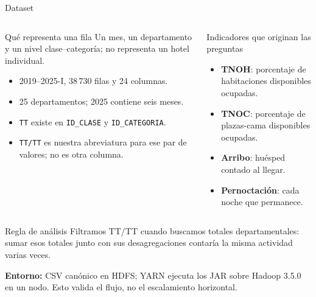 \documentclass{beamer}
\begin{document}
\begin{frame}{Dataset}
\footnotesize
\begin{columns}[T,onlytextwidth]
\begin{block}{Qué representa una fila}
Un mes, un departamento y un nivel clase--categoría; no representa un hotel individual.
\begin{itemize}
  \item 2019--2025-I, 38\,730 filas y 24 columnas.
  \item 25 departamentos; 2025 contiene seis meses.
  \item \texttt{TT} existe en \texttt{ID\_CLASE} y \texttt{ID\_CATEGORIA}.
  \item \texttt{TT/TT} es nuestra abreviatura para ese par de valores; no es otra columna.
\end{itemize}
\end{block}
\begin{block}{Indicadores que originan las preguntas}
\begin{itemize}
  \item \textbf{TNOH}: porcentaje de habitaciones disponibles ocupadas.
  \item \textbf{TNOC}: porcentaje de plazas-cama disponibles ocupadas.
  \item \textbf{Arribo}: huésped contado al llegar.
  \item \textbf{Pernoctación}: cada noche que permanece.
\end{itemize}
\end{block}
\end{columns}
\begin{alertblock}{Regla de análisis}
Filtramos TT/TT cuando buscamos totales departamentales: sumar esos totales junto con sus desagregaciones contaría la misma actividad varias veces.
\end{alertblock}
\textbf{Entorno:} CSV canónico en HDFS; YARN ejecuta los JAR sobre Hadoop 3.5.0 en un nodo. Esto valida el flujo, no el escalamiento horizontal.
\end{frame}
\end{document}
